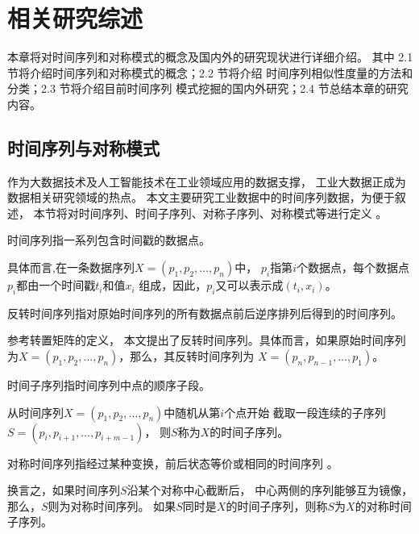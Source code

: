 
\chapter{相关研究综述}
本章将对时间序列和对称模式的概念及国内外的研究现状进行详细介绍。
其中 2.1 节将介绍时间序列和对称模式的概念；2.2 节将介绍
时间序列相似性度量的方法和分类；2.3 节将介绍目前时间序列
模式挖掘的国内外研究；2.4 节总结本章的研究内容。

\section{时间序列与对称模式}
作为大数据技术及人工智能技术在工业领域应用的数据支撑，
工业大数据正成为数据相关研究领域的热点。
本文主要研究工业数据中的时间序列数据，为便于叙述，
本节将对时间序列、时间子序列、对称子序列、对称模式等进行定义
\cite{DBLP:journals/ijsi/GaoSW21}。

\begin{definition}
  时间序列指一系列包含时间戳的数据点\cite{DBLP:journals/csur/EslingA12}。

  具体而言,在一条数据序列$X = \left( p_1,p_2,\dots,p_n \right)$中，
  $p_i$指第$i$个数据点，每个数据点$p_i$都由一个时间戳$t_i$和值$x_i$
  组成，因此，$p_i$又可以表示成$\left( t_i,x_i \right)$。
\end{definition}

\begin{definition}
  反转时间序列指对原始时间序列的所有数据点前后逆序排列后得到的时间序列。

  参考转置矩阵的定义\cite{DBLP:conf/vecpar/HishinumaHT16}，
  本文提出了反转时间序列。具体而言，如果原始时间序列
  为$X = \left( p_1,p_2,\dots,p_n \right)$，那么，其反转时间序列为
  $X = \left( p_n,p_{n-1},\dots,p_1 \right)$。
\end{definition}

\begin{definition}
  时间子序列指时间序列中点的顺序子段。

  从时间序列$X=\left( p_1,p_2,\dots,p_n \right)$中随机从第$i$个点开始
  截取一段连续的子序列$S = \left( p_i,p_{i+1},\dots,p_{i+m-1} \right)$，
  则$S$称为$X$的时间子序列。 
\end{definition}

\begin{definition}
  对称时间序列指经过某种变换，前后状态等价或相同的时间序列
  \cite{DBLP:journals/pami/NackmanP85}。

  换言之，如果时间序列$S$沿某个对称中心截断后，
  中心两侧的序列能够互为镜像，那么，$S$则为对称时间序列。
  如果$S$同时是$X$的时间子序列，则称$S$为$X$的对称时间子序列。
\end{definition}

